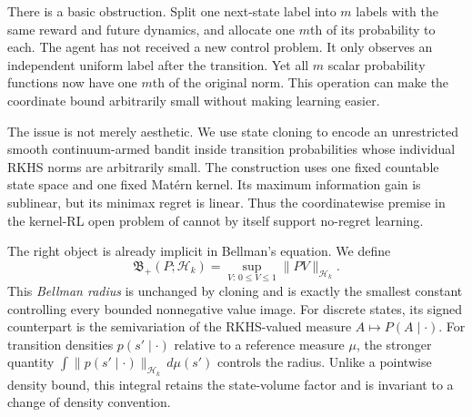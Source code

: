 \documentclass{article}
\newcommand{\cH}{\mathcal H_k}
\newcommand{\Bpos}{\mathfrak B_{+}}
\begin{document}
There is a basic obstruction. Split one next-state label into $m$ labels with the same reward and future dynamics, and allocate one $m$th of its probability to each. The agent has not received a new control problem. It only observes an independent uniform label after the transition. Yet all $m$ scalar probability functions now have one $m$th of the original norm. This operation can make the coordinate bound arbitrarily small without making learning easier.

The issue is not merely aesthetic. We use state cloning to encode an unrestricted smooth continuum-armed bandit inside transition probabilities whose individual RKHS norms are arbitrarily small. The construction uses one fixed countable state space and one fixed Mat\'ern kernel. Its maximum information gain is sublinear, but its minimax regret is linear. Thus the coordinatewise premise in the kernel-RL open problem of \citet{vakili2024open} cannot by itself support no-regret learning.

The right object is already implicit in Bellman's equation. We define
\begin{equation}
 \Bpos(P;\cH)=
 \sup_{V:\,0\leq V\leq1}\|PV\|_{\cH}.
 \label{eq:bellman-radius-intro}
\end{equation}
This \emph{Bellman radius} is unchanged by cloning and is exactly the smallest constant controlling every bounded nonnegative value image. For discrete states, its signed counterpart is the semivariation of the RKHS-valued measure $A\mapsto P(A\mid\cdot)$. For transition densities $p(s'\mid\cdot)$ relative to a reference measure $\mu$, the stronger quantity $\int\|p(s'\mid\cdot)\|_{\cH}\,d\mu(s')$ controls the radius. Unlike a pointwise density bound, this integral retains the state-volume factor and is invariant to a change of density convention.
\end{document}
